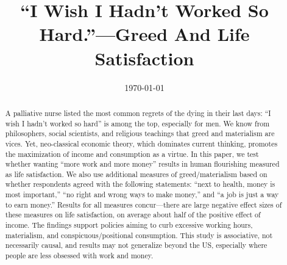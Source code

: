 \documentclass[10pt, letterpaper]{article}
\date{{}\today \hspace{.2in}\xxivtime}
\title{%
  ``I Wish I Hadn't Worked So Hard.''---Greed And Life Satisfaction %
}
\author{
}
\begin{document}


\maketitle
\vspace{-.4in}
\begin{center}

\end{center}


\begin{abstract}
\noindent A palliative nurse listed the most common regrets of the dying in
their last days: ``I wish I hadn't worked so hard'' is among the top, especially
for men. We know from philosophers, social scientists, and religious teachings
that greed and materialism are vices. Yet, neo-classical economic theory, which
dominates current thinking, promotes the maximization of income and consumption as a virtue.  
%
In this paper, we test whether wanting ``more work and more money'' results in
human flourishing measured as life satisfaction. We also use additional measures
of greed/materialism based on whether respondents agreed with the following
statements: ``next to health, money is most important,'' ``no right and wrong
ways to make money,'' and ``a job is just a way to earn money.'' Results for all
measures concur---there are large negative effect sizes of these measures on
life satisfaction, on average about half of the positive effect of income.
%
The findings support policies aiming to curb excessive working hours, materialism, and
conspicuous/positional consumption. 
%
This study is associative, not necessarily causal, and results may not generalize beyond the US, especially where people are less obsessed with work and money.  
\end{abstract}
\vspace{.15in} 
\vspace{.25in} 
\end{document}
